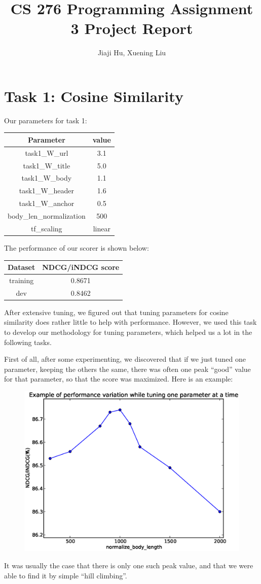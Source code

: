 \documentclass[10pt,twocolumn]{article}
\begin{document}
\title{CS 276 Programming Assignment 3 Project Report}
\author{Jiaji Hu, Xuening Liu}
\date{}
\maketitle

\section*{Task 1: Cosine Similarity}
Our parameters for task 1:
\begin{table}[H]
\centering
\begin{tabular}{|c|c|}
\hline
Parameter & value \\\hline
task1\_W\_url & 3.1\\\hline
task1\_W\_title & 5.0\\\hline
task1\_W\_body & 1.1\\\hline
task1\_W\_header & 1.6\\\hline
task1\_W\_anchor & 0.5\\\hline
body\_len\_normalization & 500\\\hline
tf\_scaling & linear\\\hline
\end{tabular}
\end{table}
The performance of our scorer is shown below:
\begin{table}[H]
\centering
\begin{tabular}{|c|c|}
\hline
Dataset & NDCG/iNDCG score \\\hline
training & 0.8671\\\hline
dev & 0.8462\\\hline
\end{tabular}
\end{table}
After extensive tuning, we figured out that tuning parameters for cosine similarity does rather little to help with performance. However, we used this task to develop our methodology for tuning parameters, which helped us a lot in the following tasks.

First of all, after some experimenting, we discovered that if we just tuned one parameter, keeping the others the same, there was often one peak ``good'' value for that parameter, so that the score was maximized. Here is an example:
\begin{figure}[H]
\centering
\includegraphics[width=0.7\linewidth]{fig1}
\end{figure}
It was usually the case that there is only one such peak value, and that we were able to find it by simple ``hill climbing''.
\end{document}
